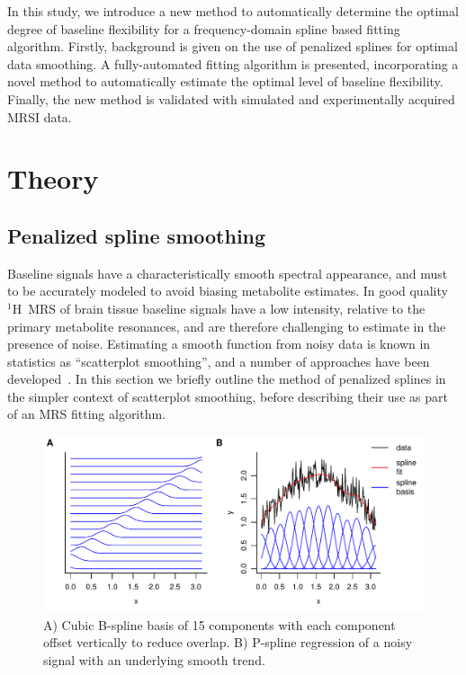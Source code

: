 \documentclass[num-refs]{wiley-article}
\newcommand{\proton}{\ensuremath{^1\mathrm{H}}}
\begin{document}
In this study, we introduce a new method to automatically determine the optimal degree of baseline flexibility for a frequency-domain spline based fitting algorithm. Firstly, background is given on the use of penalized splines for optimal data smoothing. A fully-automated fitting algorithm is presented, incorporating a novel method to automatically estimate the optimal level of baseline flexibility. Finally, the new method is validated with simulated and experimentally acquired MRSI data.

\section{Theory}
\subsection{Penalized spline smoothing}

Baseline signals have a characteristically smooth spectral appearance, and must to be accurately modeled to avoid biasing metabolite estimates. In good quality \proton\ MRS of brain tissue baseline signals have a low intensity, relative to the primary metabolite resonances, and are therefore challenging to estimate in the presence of noise. Estimating a smooth function from noisy data is known in statistics as ``scatterplot smoothing'', and a number of approaches have been developed~\cite{Ruppert2003}. In this section we briefly outline the method of penalized splines in the simpler context of scatterplot smoothing, before describing their use as part of an MRS fitting algorithm.

\begin{figure}
  \begin{center}
    \includegraphics[width=1\textwidth]{fig1.pdf}
    \caption{A) Cubic B-spline basis of 15 components with each component offset vertically to reduce overlap. B) P-spline regression of a noisy signal with an underlying smooth trend.}
    \label{bspline_regression}
  \end{center}
\end{figure}
\end{document}
